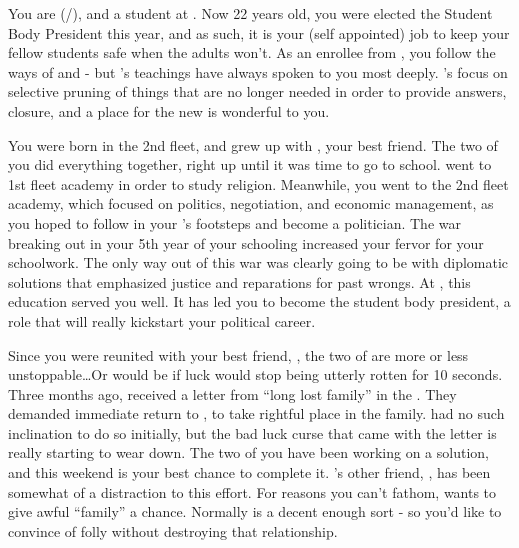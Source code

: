 \documentclass[char]{GL2020}
\begin{document}
\name{\cPresident{}}

You are \cPresident{} (\cPresident{\they}/\cPresident{\them}), and a student at \pSchool{}. Now 22 years old, you were elected the Student Body President this year, and as such, it is your (self appointed) job to keep your fellow students safe when the adults won't. As an enrollee from \pShip{}, you follow the ways of \cEbb{\full} and \cFlow{\full} - but \cEbb{}’s teachings have always spoken to you most deeply. \cEbb{}’s focus on selective pruning of things that are no longer needed in order to provide answers, closure, and a place for the new is wonderful to you.

You were born in the 2nd fleet, and grew up with \cInitiate{}, your best friend. The two of you did everything together, right up until it was time to go to school. \cInitiate{\they} went to 1st fleet academy in order to study religion. Meanwhile, you went to the 2nd fleet academy, which focused on politics, negotiation, and economic management, as you hoped to follow in your \cHeadDiplomat{\auncle}'s footsteps and become a politician. The war breaking out in your 5th year of your schooling increased your fervor for your schoolwork. The only way out of this war was clearly going to be with diplomatic solutions that emphasized justice and reparations for past wrongs. At \pSchool{}, this education served you well. It has led you to become the student body president, a role that will really kickstart your political career. 

Since you were reunited with your best friend, \cInitiate{}, the two of are more or less unstoppable\ldots Or would be if \cInitiate{\their} luck would stop being utterly rotten for 10 seconds. Three months ago, \cInitiate{} received a letter from ``long lost family'' in the \pFarm{}. They demanded \cInitiate{\their} immediate return to \pFarm{}, to take \cInitiate{\their} rightful place in the family. \cInitiate{} had no such inclination to do so initially, but the bad luck curse that came with the letter is really starting to wear \cInitiate{\them} down. The two of you have been working on a solution, and this weekend is your best chance to complete it. \cInitiate{}’s other friend, \cWarlordDaughter{}, has been somewhat of a distraction to this effort. For reasons you can’t fathom,  \cWarlordDaughter{} wants \cInitiate{} to give \cInitiate{\their} awful ``family'' a chance. Normally \cWarlordDaughter{} is a decent enough sort - so you’d like to convince \cWarlordDaughter{} of \cWarlordDaughter{\their} folly without destroying that relationship.
\end{document}
